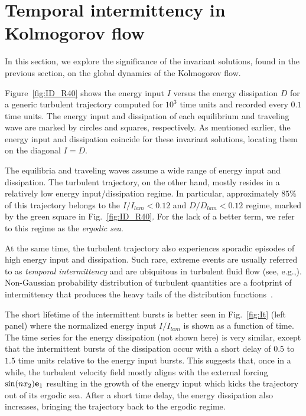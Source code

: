 \documentclass{jfm}
\begin{document}
\section{Temporal intermittency in Kolmogorov flow}\label{sec:interm}
In this section, we explore the significance of the invariant solutions, 
found in the previous section,
on the global dynamics of the Kolmogorov flow.

Figure~\ref{fig:ID_R40} shows the energy input $I$ versus the energy dissipation $D$
for a generic turbulent trajectory computed for $10^3$ time units
and recorded every $0.1$ time units.
The energy input
and dissipation of each equilibrium and traveling wave are marked by circles and squares,
respectively. As mentioned earlier, the energy input and dissipation coincide for these invariant
solutions, locating them on the diagonal $I=D$.

The equilibria and traveling waves assume a wide range of energy input and dissipation.
The turbulent trajectory, on the other hand,
mostly resides in a relatively low energy input/dissipation
regime. In particular, approximately $85\%$ of this trajectory belongs to the $I/I_{lam}<0.12$ and
$D/D_{lam}<0.12$ regime, marked by the green square in Fig.~\ref{fig:ID_R40}. For the lack
of a better term, we refer to this regime as the \emph{ergodic sea}.

At the same time, the turbulent trajectory also experiences sporadic episodes of high energy input
and dissipation. Such rare, extreme events are usually referred to as \emph{temporal intermittency}
and are ubiquitous in turbulent fluid flow (see, e.g.,).
Non-Gaussian probability distribution of
turbulent quantities are a footprint of intermittency that produces the
heavy tails of the distribution functions~\citep{mini10}.

The short lifetime of the intermittent bursts is better seen in Fig.~\ref{fig:It}
(left panel) where the normalized energy input $I/I_{lam}$ is shown
as a function of time. The time series for the energy dissipation
(not shown here) is very similar, except that the intermittent bursts of
the dissipation occur with a short delay of $0.5$ to $1.5$ time units
relative to the energy input bursts. This suggests that, once in a while,
the turbulent velocity field mostly aligns with the external forcing $\sin(nx_2)\mathbf e_1$
resulting in the growth of the energy input which kicks the
trajectory out of its ergodic sea. After a short time delay, the energy
dissipation also increases, bringing the trajectory back to the ergodic regime.
\end{document}

